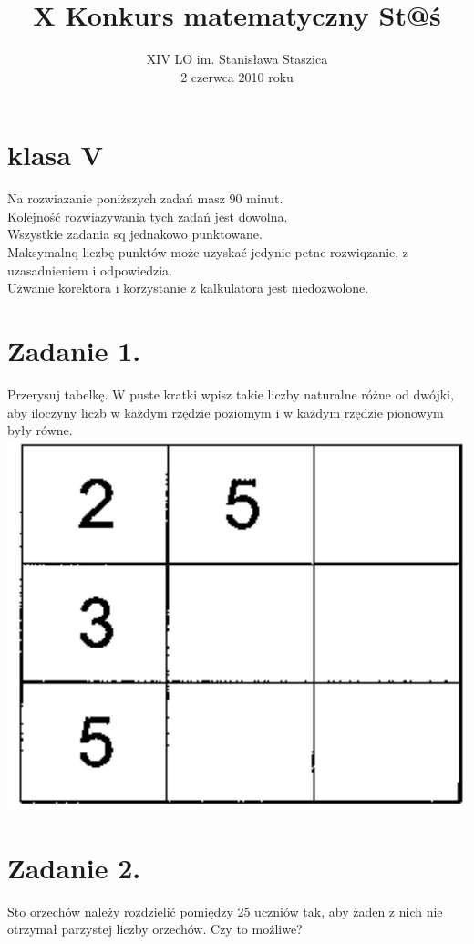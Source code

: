 \documentclass[10pt]{article}
\title{X Konkurs matematyczny St@ś }
\author{XIV LO im. Stanisława Staszica\\
2 czerwca 2010 roku}
\date{}
\begin{document}
\maketitle


\section*{klasa V}
Na rozwiazanie poniższych zadań masz 90 minut.\\
Kolejność rozwiazywania tych zadań jest dowolna.\\
Wszystkie zadania sq jednakowo punktowane.\\
Maksymalnq liczbę punktów może uzyskać jedynie petne rozwiqzanie, z uzasadnieniem i odpowiedzia.\\
Użwanie korektora i korzystanie z kalkulatora jest niedozwolone.

\section*{Zadanie 1.}
Przerysuj tabelkę. W puste kratki wpisz takie liczby naturalne różne od dwójki, aby iloczyny liczb w każdym rzędzie poziomym i w każdym rzędzie pionowym były równe.\\
\includegraphics[max width=\textwidth, center]{2024_11_21_a3163903e65e7e4f74cag-1}

\section*{Zadanie 2.}
Sto orzechów należy rozdzielić pomiędzy 25 uczniów tak, aby żaden z nich nie otrzymał parzystej liczby orzechów. Czy to możliwe?
\end{document}
